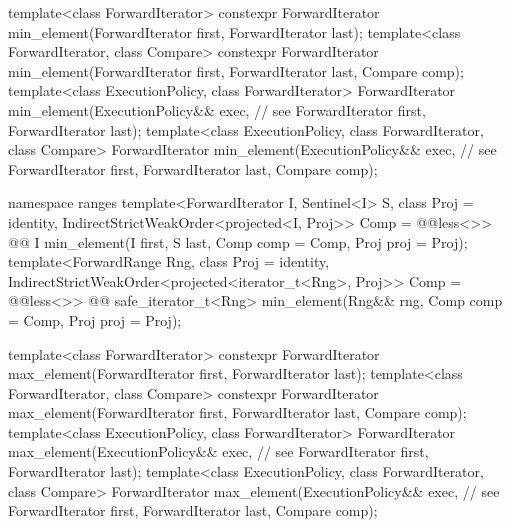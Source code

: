 \begin{codeblock}
  template<class ForwardIterator>
    constexpr ForwardIterator min_element(ForwardIterator first, ForwardIterator last);
  template<class ForwardIterator, class Compare>
    constexpr ForwardIterator min_element(ForwardIterator first, ForwardIterator last,
                                          Compare comp);
  template<class ExecutionPolicy, class ForwardIterator>
    ForwardIterator min_element(ExecutionPolicy&& exec, // see 
                                ForwardIterator first, ForwardIterator last);
  template<class ExecutionPolicy, class ForwardIterator, class Compare>
    ForwardIterator min_element(ExecutionPolicy&& exec, // see 
                                ForwardIterator first, ForwardIterator last,
                                Compare comp);
\end{codeblock}\begin{addedblock}\begin{codeblock}
  namespace ranges {
    template<ForwardIterator I, Sentinel<I> S, class Proj = identity,
        IndirectStrictWeakOrder<projected<I, Proj>> Comp = @@less<>>
      @@ I min_element(I first, S last, Comp comp = Comp{}, Proj proj = Proj{});
    template<ForwardRange Rng, class Proj = identity,
        IndirectStrictWeakOrder<projected<iterator_t<Rng>, Proj>> Comp = @@less<>>
      @@ safe_iterator_t<Rng>
        min_element(Rng&& rng, Comp comp = Comp{}, Proj proj = Proj{});
  }
\end{codeblock}\end{addedblock}\begin{codeblock}
  template<class ForwardIterator>
    constexpr ForwardIterator max_element(ForwardIterator first, ForwardIterator last);
  template<class ForwardIterator, class Compare>
    constexpr ForwardIterator max_element(ForwardIterator first, ForwardIterator last,
                                          Compare comp);
  template<class ExecutionPolicy, class ForwardIterator>
    ForwardIterator max_element(ExecutionPolicy&& exec, // see 
                                ForwardIterator first, ForwardIterator last);
  template<class ExecutionPolicy, class ForwardIterator, class Compare>
    ForwardIterator max_element(ExecutionPolicy&& exec, // see 
                                ForwardIterator first, ForwardIterator last,
                                Compare comp);
\end{codeblock}\begin{addedblock}\begin{codeblock}

\end{codeblock}
\end{addedblock}
